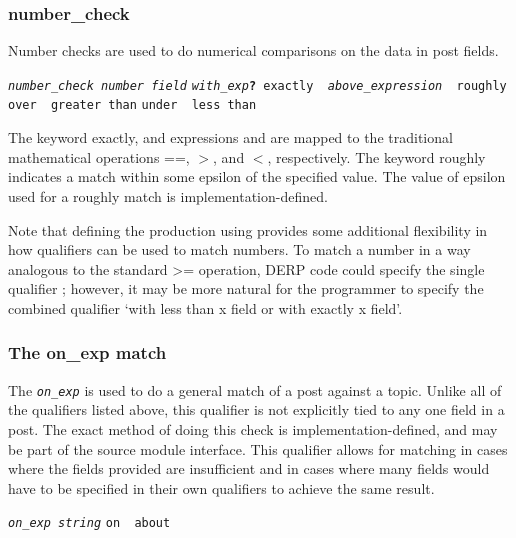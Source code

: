 \subsubsection{number\_check}
Number checks are used to do numerical comparisons on the data in post fields.
\begin{description}[labelindent=1cm,leftmargin=\onelen,labelwidth=1cm]
          \texttt{\textit{number\_check number field}}
          \texttt{\textit{with\_exp}\textbf{?} exactly \textbf{\textbar} \textit{above\_expression} \textbf{\textbar} roughly}
          \texttt{over \textbf{\textbar} greater than}
          \texttt{under \textbf{\textbar} less than}
\end{description}
The keyword exactly, and expressions  and  are mapped to the traditional mathematical operations ==, $>$, and $<$, respectively.
The keyword roughly indicates a match within some epsilon of the specified value. The value of epsilon used for a roughly match is implementation-defined.

Note that defining the  production using  provides some additional flexibility in how qualifiers can be used to match numbers. To match a
number in a way analogous to the standard >= operation, DERP code could specify the single qualifier ; however, it may be more natural
for the programmer to specify the combined qualifier ‘with less than x field or with exactly x field’.





\subsubsection{The on\_exp match}
The \texttt{\textit{on\_exp}} is used to do a general match of a post against a topic. Unlike all of the qualifiers listed above, this qualifier is not explicitly
tied to any one field in a post. The exact method of doing this check is implementation-defined, and may be part of the source module interface. This qualifier
allows for matching in cases where the fields provided are insufficient and in cases where many fields would have to be specified in their own qualifiers to achieve
the same result.
\begin{description}[labelindent=1cm,leftmargin=\onelen,labelwidth=1cm]
       \texttt{\textit{on\_exp string}}
       \texttt{on \textbf{\textbar} about}
\end{description}




